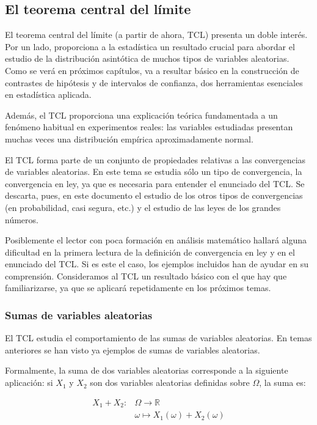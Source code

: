 \documentclass[
]{article}
\begin{document}
\subsection{El teorema central del límite}\label{el-teorema-central-del-luxedmite}

El teorema central del límite (a partir de ahora, TCL) presenta un doble interés. Por un lado, proporciona a la estadística un resultado crucial para abordar el estudio de la distribución asintótica de muchos tipos de variables aleatorias. Como se verá en próximos capítulos, va a resultar básico en la construcción de contrastes de hipótesis y de intervalos de confianza, dos herramientas esenciales en estadística aplicada.

Además, el TCL proporciona una explicación teórica fundamentada a un fenómeno habitual en experimentos reales: las variables estudiadas presentan muchas veces una distribución empírica aproximadamente normal.

El TCL forma parte de un conjunto de propiedades relativas a las convergencias de variables aleatorias. En este tema se estudia sólo un tipo de convergencia, la convergencia en ley, ya que es necesaria para entender el enunciado del TCL. Se descarta, pues, en este documento el estudio de los otros tipos de convergencias (en probabilidad, casi segura, etc.) y el estudio de las leyes de los grandes números.

Posiblemente el lector con poca formación en análisis matemático hallará alguna dificultad en la primera lectura de la definición de convergencia en ley y en el enunciado del TCL. Si es este el caso, los ejemplos incluidos han de ayudar en su comprensión. Consideramos al TCL un resultado básico con el que hay que familiarizarse, ya que se aplicará repetidamente en los próximos temas.

\subsubsection{Sumas de variables aleatorias}\label{sumas-de-variables-aleatorias}

El TCL estudia el comportamiento de las sumas de variables aleatorias. En temas anteriores se han visto ya ejemplos de sumas de variables aleatorias.

Formalmente, la suma de dos variables aleatorias corresponde a la siguiente aplicación: si \(X_{1}\) y \(X_{2}\) son dos variables aleatorias definidas sobre \(\Omega\), la suma es:

\[
\begin{aligned}
X_{1}+X_{2}: & \Omega \rightarrow \mathbb{R} \\
& \omega \mapsto X_{1}(\omega)+X_{2}(\omega)
\end{aligned}
\]
\end{document}

